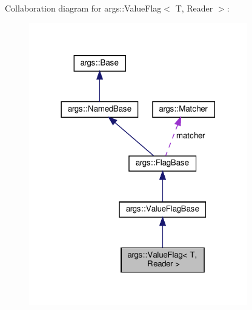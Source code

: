 Collaboration diagram for args\+:\+:Value\+Flag$<$ T, Reader $>$\+:\nopagebreak
\begin{figure}[H]
\begin{center}
\leavevmode
\includegraphics[width=270pt]{classargs_1_1_value_flag__coll__graph}
\end{center}
\end{figure}
